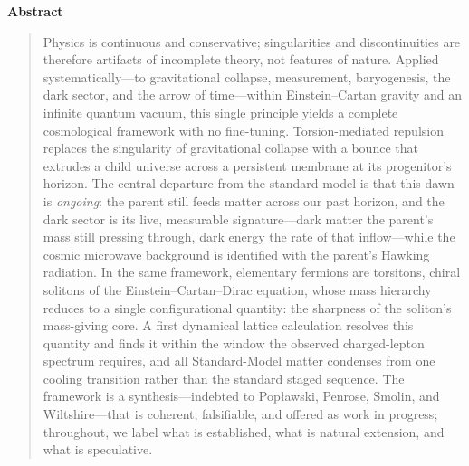 \thispagestyle{empty}
\vspace*{2em}
\begin{center}
  {\large\bfseries Abstract}
\end{center}
\vspace{0.5em}
\begin{quote}
\noindent Physics is continuous and conservative; singularities and discontinuities are therefore
artifacts of incomplete theory, not features of nature. Applied systematically---to gravitational
collapse, measurement, baryogenesis, the dark sector, and the arrow of time---within Einstein--Cartan
gravity and an infinite quantum vacuum, this single principle yields a complete cosmological framework
with no fine-tuning. Torsion-mediated repulsion replaces the singularity of gravitational collapse
with a bounce that extrudes a child universe across a persistent membrane at its progenitor's horizon.
The central departure from the standard model is that this dawn is \emph{ongoing}: the parent still
feeds matter across our past horizon, and the dark sector is its live, measurable signature---dark
matter the parent's mass still pressing through, dark energy the rate of that inflow---while the
cosmic microwave background is identified with the parent's Hawking radiation. In the same framework,
elementary fermions are torsitons, chiral solitons of the Einstein--Cartan--Dirac equation, whose mass
hierarchy reduces to a single configurational quantity: the sharpness of the soliton's mass-giving
core. A first dynamical lattice calculation resolves this quantity and finds it within the window the
observed charged-lepton spectrum requires, and all Standard-Model matter condenses from one cooling
transition rather than the standard staged sequence. The framework is a synthesis---indebted to
Pop\l{}awski, Penrose, Smolin, and Wiltshire---that is coherent, falsifiable, and offered as work in
progress; throughout, we label what is established, what is natural extension, and what is speculative.
\end{quote}
\vspace{1em}
\cleardoublepage
